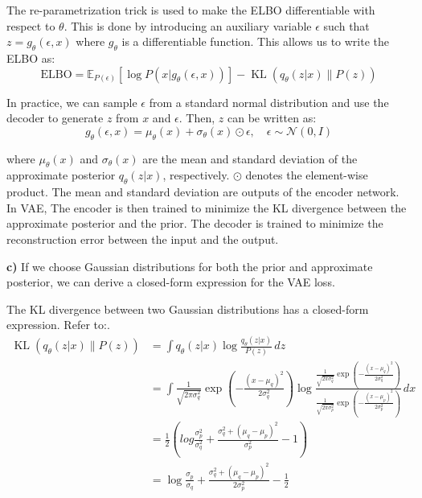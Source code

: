 \documentclass{homework}
\begin{document}

The re-parametrization trick is used to make the ELBO differentiable with respect to $\theta$. This is done by introducing an auxiliary variable $\epsilon$ such that $z = g_{\theta}(\epsilon, x)$ where $g_{\theta}$ is a differentiable function. This allows us to write the ELBO as:
$$
\mathrm{ELBO}=\mathbb{E}_{P(\epsilon)}[\log P(x | g_{\theta}(\epsilon, x))]-\operatorname{KL}\left(q_{\theta}(z | x) \| P(z)\right)
$$

In practice, we can sample $\epsilon$ from a standard normal distribution and use the decoder to generate $z$ from $x$ and $\epsilon$. Then, $z$ can be written as:
$$
g_{\theta}(\epsilon, x)=\mu_{\theta}(x)+\sigma_{\theta}(x) \odot \epsilon , \quad \epsilon \sim \mathcal{N}(0, I)
$$

where $\mu_{\theta}(x)$ and $\sigma_{\theta}(x)$ are the mean and standard deviation of the approximate posterior $q_{\theta}(z | x)$, respectively. $\odot$ denotes the element-wise product. The mean and standard deviation are outputs of the encoder network. 
In VAE, The encoder is then trained to minimize the KL divergence between the approximate posterior and the prior. The decoder is trained to minimize the reconstruction error between the input and the output.

\textbf{c)} If we choose Gaussian distributions for both the prior and approximate posterior, we can derive a closed-form expression for the VAE loss. 

The KL divergence between two Gaussian distributions has a closed-form expression. Refer to:\cite{JianlinSu_nodate}.
$$
\begin{aligned}
\operatorname{KL}\left(q_{\theta}(z | x) \| P(z)\right)
&=\int q_{\theta}(z | x) \log \frac{q_{\theta}(z | x)}{P(z)} \,dz \\
&=\int \frac{1}{\sqrt{2 \pi \sigma_{q}^{2}}} \exp \left(-\frac{\left(x-\mu_{q}\right)^{2}}{2 \sigma_{q}^{2}}\right) \log \frac{\frac{1}{\sqrt{2 \pi \sigma_{q}^{2}}} \exp \left(-\frac{\left(x-\mu_{q}\right)^{2}}{2 \sigma_{q}^{2}}\right)}{\frac{1}{\sqrt{2 \pi \sigma_{p}^{2}}} \exp \left(-\frac{\left(x-\mu_{p}\right)^{2}}{2 \sigma_{p}^{2}}\right)} \,dx \\
&=\frac{1}{2} \left( log \frac{\sigma_{p}^{2}}{\sigma_{q}^{2}}+\frac{\sigma_{q}^{2}+\left(\mu_{q}-\mu_{p}\right)^{2}}{\sigma_{p}^{2}} - 1 \right) \\\
&=\log \frac{\sigma_p}{\sigma_q} + \frac{\sigma_q^2 + (\mu_q - \mu_p)^2}{2\sigma_p^2} - \frac{1}{2}
\end{aligned}
$$
\end{document}
